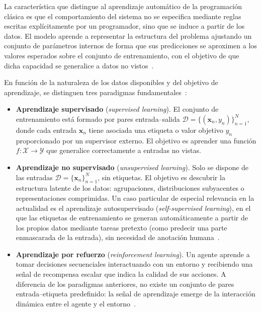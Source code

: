 \documentclass[11pt,spanish,listoffigures,listoftables]{tfgetsinf}
\begin{document}
La característica que distingue al aprendizaje automático de la programación
clásica es que el comportamiento del sistema no se especifica mediante reglas
escritas explícitamente por un programador, sino que se induce a partir
de los datos. El modelo aprende a representar la estructura del problema ajustando
un conjunto de parámetros internos de forma que sus predicciones se aproximen a
los valores esperados sobre el conjunto de entrenamiento, con el objetivo de que
dicha capacidad se generalice a datos no vistos~\cite{murphy2022pml}.

En función de la naturaleza de los datos disponibles y del objetivo de aprendizaje,
se distinguen tres paradigmas fundamentales~\cite{murphy2022pml,murphy2023adv}:

\begin{itemize}
    \item \textbf{Aprendizaje supervisado} (\textit{supervised learning}).
    El conjunto de entrenamiento está formado por pares entrada--salida
    $\mathcal{D} = \{(\mathbf{x}_n, y_n)\}_{n=1}^{N}$, donde cada entrada
    $\mathbf{x}_n$ tiene asociada una etiqueta o valor objetivo $y_n$ proporcionado
    por un supervisor externo. El objetivo es aprender una función
    $f: \mathcal{X} \rightarrow \mathcal{Y}$ que generalice correctamente a entradas
    no vistas.

    \item \textbf{Aprendizaje no supervisado} (\textit{unsupervised learning}).
    Solo se dispone de las entradas $\mathcal{D} = \{\mathbf{x}_n\}_{n=1}^{N}$,
    sin etiquetas. El objetivo es descubrir la estructura latente de los datos:
    agrupaciones, distribuciones subyacentes o representaciones comprimidas.
    Un caso particular de especial relevancia en la actualidad es el
    aprendizaje autosupervisado (\textit{self-supervised learning}), en
    el que las etiquetas de entrenamiento se generan automáticamente a partir de
    los propios datos mediante tareas pretexto (como predecir una parte
    enmascarada de la entrada), sin necesidad de anotación humana~\cite{murphy2022pml}.

    \item \textbf{Aprendizaje por refuerzo} (\textit{reinforcement learning}).
    Un agente aprende a tomar decisiones secuenciales interactuando con un entorno
    y recibiendo una señal de recompensa escalar que indica la calidad de sus
    acciones. A diferencia de los paradigmas anteriores, no existe un conjunto de
    pares entrada--etiqueta predefinido: la señal de aprendizaje emerge de la
    interacción dinámica entre el agente y el entorno~\cite{murphy2022pml}.
\end{itemize}
\end{document}
